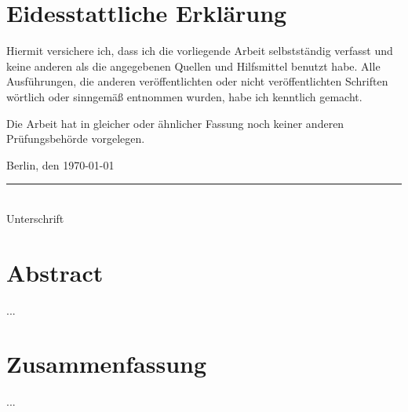 \BlankPage

\chapter*{Eidesstattliche Erklärung}
Hiermit versichere ich, dass ich die vorliegende Arbeit selbstständig verfasst und keine anderen als die angegebenen Quellen und Hilfsmittel benutzt habe. Alle Ausführungen, die anderen veröffentlichten oder nicht veröffentlichten Schriften wörtlich oder sinngemäß entnommen wurden, habe ich kenntlich gemacht.

Die Arbeit hat in gleicher oder ähnlicher Fassung noch keiner anderen Prüfungsbehörde vorgelegen.
\vspace{10mm}

Berlin, den \today\\

\vspace{1cm}
\rule{.5\textwidth}{.5pt}\\
Unterschrift

\BlankPage

\chapter*{Abstract}
...

\BlankPage

\chapter*{Zusammenfassung}
...

\BlankPage

\tableofcontents

\listoffigures

\listoftables


